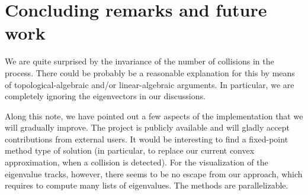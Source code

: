\documentclass{article}
\begin{document}
	\section{Concluding remarks and future work} \label{section:concluding-remarks}

	We are quite surprised by the invariance of the number of collisions in the process.
	There could be probably be a reasonable explanation for this by means of topological-algebraic 
	and/or linear-algebraic arguments.
	In particular, we are completely ignoring the eigenvectors in our discussions. 

	Along this note, we have pointed out a few aspects of the implementation 
	that we will gradually improve. 
	The project is publicly available and will gladly accept contributions from external users. 
	It would be interesting to find a fixed-point method type of solution
	(in particular, to replace our current convex approximation, when a collision is detected). 
	For the visualization of the eigenvalue tracks, however, 
	there seems to be no escape from our approach, 
	which requires to compute many lists of eigenvalues. 
	The methods are parallelizable.

		
	    

  
	\appendix

	\newpage
	
\end{document}
